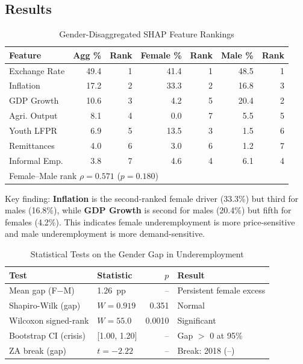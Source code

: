\documentclass[11pt,a4paper]{article}
\begin{document}
\subsection{Results}

\begin{table}[ht]
\caption{Gender-Disaggregated SHAP Feature Rankings}
\label{tab:gender_shap}
\setlength{\tabcolsep}{3pt}
\footnotesize
\begin{tabular}{lrrrrrr}
\toprule
\textbf{Feature} & \textbf{Agg \%} & \textbf{Rank} & \textbf{Female \%} & \textbf{Rank} & \textbf{Male \%} & \textbf{Rank}\\
\midrule
Exchange Rate & 49.4 & 1 & 41.4 & 1 & 48.5 & 1\\
Inflation & 17.2 & 2 & 33.3 & 2 & 16.8 & 3\\
GDP Growth & 10.6 & 3 & 4.2 & 5 & 20.4 & 2\\
Agri. Output & 8.1 & 4 & 0.0 & 7 & 5.5 & 5\\
Youth LFPR & 6.9 & 5 & 13.5 & 3 & 1.5 & 6\\
Remittances & 4.0 & 6 & 3.0 & 6 & 1.2 & 7\\
Informal Emp. & 3.8 & 7 & 4.6 & 4 & 6.1 & 4\\
\midrule
\multicolumn{7}{l}{\scriptsize Female--Male rank $\rho = 0.571$ ($p = 0.180$)}\\
\bottomrule
\end{tabular}
\end{table}

Key finding: \textbf{Inflation} is the second-ranked female driver (33.3\%) but third for males (16.8\%), while \textbf{GDP Growth} is second for males (20.4\%) but fifth for females (4.2\%). This indicates female underemployment is more price-sensitive and male underemployment is more demand-sensitive.

\begin{table}[ht]
\caption{Statistical Tests on the Gender Gap in Underemployment}
\label{tab:gender_gap_tests}
\footnotesize
\begin{tabular}{llrl}
\toprule
\textbf{Test} & \textbf{Statistic} & \textbf{$p$} & \textbf{Result}\\
\midrule
Mean gap (F$-$M) & 1.26~pp & -- & Persistent female excess\\
Shapiro-Wilk (gap) & $W=0.919$ & 0.351 & Normal\\
Wilcoxon signed-rank & $W=55.0$ & 0.0010 & Significant\\
Bootstrap CI (crisis) & [1.00, 1.20] & -- & Gap $>$ 0 at 95\%\\
ZA break (gap) & $t=-2.22$ & -- & Break: 2018 (--)\\
\bottomrule
\end{tabular}
\end{table}
\end{document}
